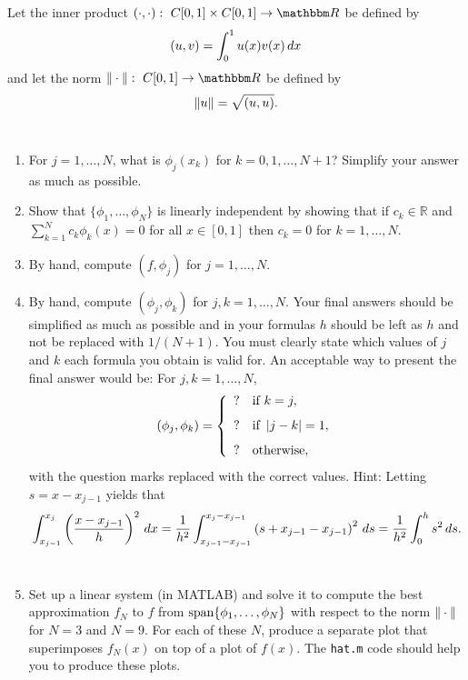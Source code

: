 Let the inner product $\ip{\cdot,\cdot}:\mbox{ }C[0,1]\times C[0,1]\rightarrow\R$ be defined by
\[
(u,v) = \int_0^1 u(x)v(x)\, dx
\]
and let the norm $\norm{\cdot}:\mbox{ }C[0,1]\rightarrow\R$ be defined by
\[
\|u\| = \sqrt{(u,u)}.
\]
\\
\begin{enumerate}
\item For $j=1,\ldots,N$, what is $\phi_j(x_k)$ for $k=0,1,\ldots,N+1$? Simplify your answer as much as possible.
\\
\item Show that $\{\phi_1, \ldots, \phi_N\}$ is linearly independent by showing that if $c_k\in\mathbb{R}$ and $\displaystyle{\sum_{k=1}^N}c_k\phi_k(x)=0$ for all $x\in[0,1]$ then $c_k=0$ for $k=1,\ldots,N$.
\\
\item By hand, compute $(f,\phi_j)$ for $j=1,\ldots, N$.
\\
\item By hand, compute $(\phi_j, \phi_k)$ for $j,k=1,\ldots, N$. Your final answers should be simplified as much as possible and in your formulas $h$ should be left as $h$ and not be replaced with $1/(N+1)$. You must clearly state which values of $j$ and $k$ each formula you obtain is valid for. An acceptable way to present the final answer would be:\newline
For $j,k=1,\ldots,N$,
\[
(\phi_j,\phi_k)=\left\{\begin{array}{ll}? & \mbox{if }k=j, \\[.75em] ? & \mbox{if }\left|j-k\right|=1, \\[.75em] ? & \mbox{otherwise},\end{array}\right.
\]
with the question marks replaced with the correct values. Hint: Letting $s=x-x_{j-1}$ yields that
\[
\int_{x_{j-1}}^{x_j}\left({x-x_{j-1}\over h}\right)^2\,dx={1 \over h^2}\int_{x_{j-1}-x_{j-1}}^{x_j-x_{j-1}}\left(s+x_{j-1}-x_{j-1}\right)^2\,ds={1 \over h^2}\int_0^hs^2\,ds.
\]
\\
\item Set up a linear system (in MATLAB) and solve it to compute the best approximation $f_N$ to $f$ from ${\rm span}\{\phi_1, \ldots, \phi_N\}$  with respect to the norm $\|\cdot\|$ for $N=3$ and $N=9$. For each of these $N$, produce a separate plot that superimposes $f_N(x)$ on top of a plot of $f(x)$. The \verb|hat.m| code 
should help you to produce these plots.

\end{enumerate}



